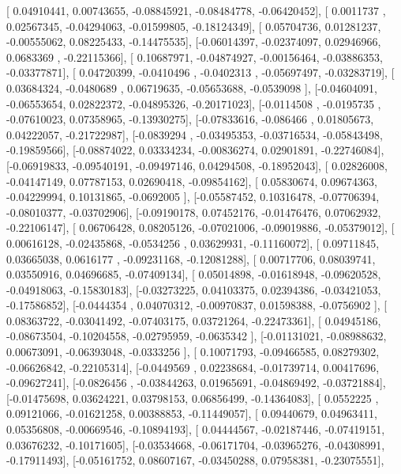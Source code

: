 \documentclass{article}
\begin{document}
       [ 0.04910441,  0.00743655, -0.08845921, -0.08484778, -0.06420452],
       [ 0.0011737 ,  0.02567345, -0.04294063, -0.01599805, -0.18124349],
       [ 0.05704736,  0.01281237, -0.00555062,  0.08225433, -0.14475535],
       [-0.06014397, -0.02374097,  0.02946966,  0.0683369 , -0.22115366],
       [ 0.10687971, -0.04874927, -0.00156464, -0.03886353, -0.03377871],
       [ 0.04720399, -0.0410496 , -0.0402313 , -0.05697497, -0.03283719],
       [ 0.03684324, -0.0480689 ,  0.06719635, -0.05653688, -0.0539098 ],
       [-0.04604091, -0.06553654,  0.02822372, -0.04895326, -0.20171023],
       [-0.0114508 , -0.0195735 , -0.07610023,  0.07358965, -0.13930275],
       [-0.07833616, -0.086466  ,  0.01805673,  0.04222057, -0.21722987],
       [-0.0839294 , -0.03495353, -0.03716534, -0.05843498, -0.19859566],
       [-0.08874022,  0.03334234, -0.00836274,  0.02901891, -0.22746084],
       [-0.06919833, -0.09540191, -0.09497146,  0.04294508, -0.18952043],
       [ 0.02826008, -0.04147149,  0.07787153,  0.02690418, -0.09854162],
       [ 0.05830674,  0.09674363, -0.04229994,  0.10131865, -0.0692005 ],
       [-0.05587452,  0.10316478, -0.07706394, -0.08010377, -0.03702906],
       [-0.09190178,  0.07452176, -0.01476476,  0.07062932, -0.22106147],
       [ 0.06706428,  0.08205126, -0.07021006, -0.09019886, -0.05379012],
       [ 0.00616128, -0.02435868, -0.0534256 ,  0.03629931, -0.11160072],
       [ 0.09711845,  0.03665038,  0.0616177 , -0.09231168, -0.12081288],
       [ 0.00717706,  0.08039741,  0.03550916,  0.04696685, -0.07409134],
       [ 0.05014898, -0.01618948, -0.09620528, -0.04918063, -0.15830183],
       [-0.03273225,  0.04103375,  0.02394386, -0.03421053, -0.17586852],
       [-0.0444354 ,  0.04070312, -0.00970837,  0.01598388, -0.0756902 ],
       [ 0.08363722, -0.03041492, -0.07403175,  0.03721264, -0.22473361],
       [ 0.04945186, -0.08673504, -0.10204558, -0.02795959, -0.0635342 ],
       [-0.01131021, -0.08988632,  0.00673091, -0.06393048, -0.0333256 ],
       [ 0.10071793, -0.09466585,  0.08279302, -0.06626842, -0.22105314],
       [-0.0449569 ,  0.02238684, -0.01739714,  0.00417696, -0.09627241],
       [-0.0826456 , -0.03844263,  0.01965691, -0.04869492, -0.03721884],
       [-0.01475698,  0.03624221,  0.03798153,  0.06856499, -0.14364083],
       [ 0.0552225 ,  0.09121066, -0.01621258,  0.00388853, -0.11449057],
       [ 0.09440679,  0.04963411,  0.05356808, -0.00669546, -0.10894193],
       [ 0.04444567, -0.02187446, -0.07419151,  0.03676232, -0.10171605],
       [-0.03534668, -0.06171704, -0.03965276, -0.04308991, -0.17911493],
       [-0.05161752,  0.08607167, -0.03450288,  0.07958381, -0.23075551],
\end{document}
